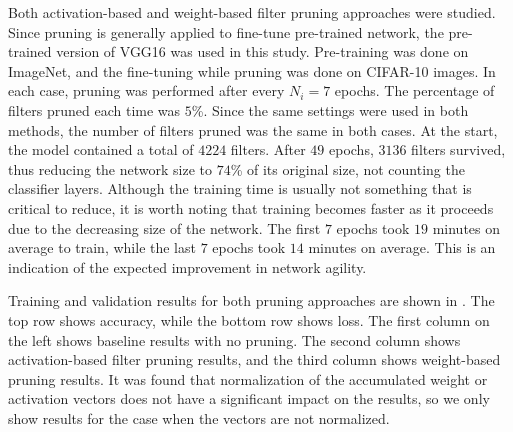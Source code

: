 \documentclass{article}
\begin{document}
Both activation-based and weight-based filter pruning approaches were studied. Since pruning is generally applied to fine-tune pre-trained network, the pre-trained version of VGG16 was used in this study. Pre-training was done on ImageNet, and the fine-tuning while pruning was done on CIFAR-10 images. In each case, pruning was performed after every $N_i = 7$ epochs. The percentage of filters pruned each time was $5$\%. Since the same settings were used in both methods, the number of filters pruned was the same in both cases. At the start, the model contained a total of $4224$ filters. After $49$ epochs, $3136$ filters survived, thus reducing the network size to $74$\% of its original size, not counting the classifier layers. Although the training time is usually not something that is critical to reduce, it is worth noting that training becomes faster as it proceeds due to the decreasing size of the network. The first $7$ epochs took $19$ minutes on average to train, while the last $7$ epochs took $14$ minutes on average. This is an indication of the expected improvement in network agility.

Training and validation results for both pruning approaches are shown in . The top row shows accuracy, while the bottom row shows loss. The first column on the left shows baseline results with no pruning. The second column shows activation-based filter pruning results, and the third column shows weight-based pruning results. It was found that normalization of the accumulated weight or activation vectors does not have a significant impact on the results, so we only show results for the case when the vectors are not normalized.
\end{document}
